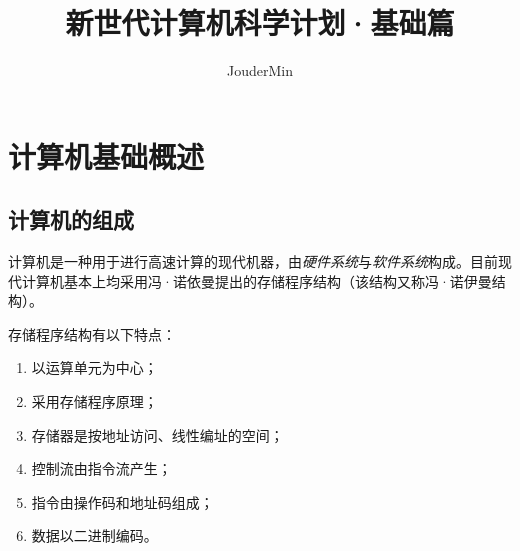 \documentclass[lang=cn, chinesefont=founder, math=mtpro2, color=cyan, citestyle=gb7714-2015, bibstyle=gb7714-2015]{elegantbook}
\title{新世代计算机科学计划·基础篇}
\author{JouderMin}
\institute{「新世代计算机科学计划」制作委员会}
\date{\zhtoday}
\begin{document}
\maketitle
\frontmatter

\tableofcontents

\mainmatter

\chapter{计算机基础概述}
\section{计算机的组成}

计算机是一种用于进行高速计算的现代机器，由\emph{硬件系统}与\emph{软件系统}构成。目前现代计算机基本上均采用冯·诺依曼提出的存储程序结构（该结构又称冯·诺伊曼结构）。

存储程序结构有以下特点：
\begin{enumerate}
    \item 以运算单元为中心；
    \item 采用存储程序原理；
    \item 存储器是按地址访问、线性编址的空间；
    \item 控制流由指令流产生；
    \item 指令由操作码和地址码组成；
    \item 数据以二进制编码。
\end{enumerate}
\end{document}
